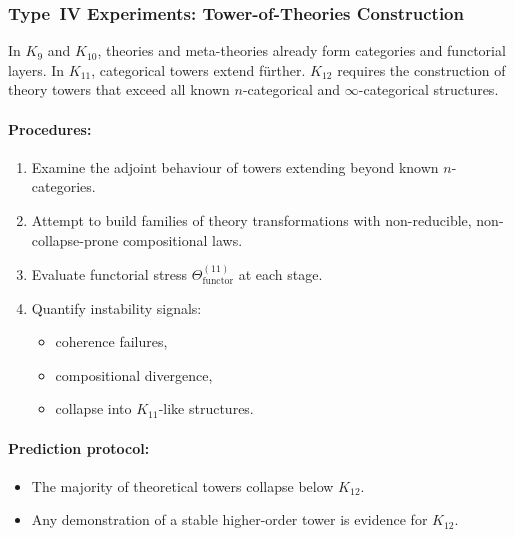 \subsubsection{Type~IV Experiments: Tower-of-Theories Construction}

In $K_{9}$ and $K_{10}$, theories and meta-theories already form 
categories and functorial layers.  
In $K_{11}$, categorical towers extend fürther.  
$K_{12}$ requires the construction of theory towers that exceed all 
known $n$-categorical and $\infty$-categorical structures.

\paragraph{Procedures:}

\begin{enumerate}
    \item Examine the adjoint behaviour of towers extending beyond 
          known $n$-categories.
    \item Attempt to build families of theory transformations with  
          non-reducible, non-collapse-prone compositional laws.
    \item Evaluate functorial stress 
          $\Theta_{\mathrm{functor}}^{(11)}$ at each stage.
    \item Quantify instability signals:
          \begin{itemize}
              \item coherence failures,
              \item compositional divergence,
              \item collapse into $K_{11}$-like structures.
          \end{itemize}
\end{enumerate}

\paragraph{Prediction protocol:}

\begin{itemize}
    \item The majority of theoretical towers collapse below $K_{12}$.
    \item Any demonstration of a stable higher-order tower is evidence 
          for $K_{12}$.
\end{itemize}



